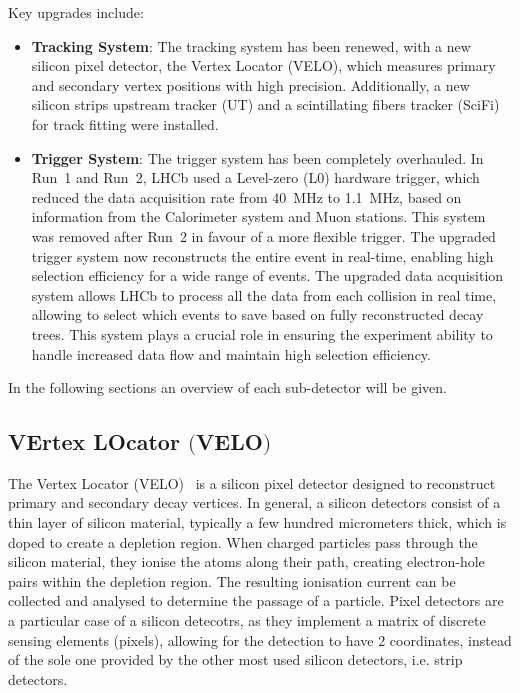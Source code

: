 Key upgrades include:
\begin{itemize}
\item \textbf{Tracking System}: The tracking system has been renewed, with a new silicon pixel detector, the Vertex Locator (VELO), which measures primary and secondary vertex positions with high precision. Additionally, a new silicon strips upstream tracker (UT) and a scintillating fibers tracker (SciFi) for track fitting were installed.

\item \textbf{Trigger System}: The trigger system has been completely overhauled. In Run~1 and Run~2, LHCb used a Level-zero (L$0$) hardware trigger, which reduced the data acquisition rate from \SI{40}{\mega\hertz} to \SI{1.1}{\mega\hertz}, based on information from the Calorimeter system and Muon stations. This system was removed after Run~2 in favour of a more flexible trigger. The upgraded trigger system now reconstructs the entire event in real-time, enabling high selection efficiency for a wide range of events. The upgraded data acquisition system allows LHCb to process all the data from each collision in real time, allowing to select which events to save based on fully reconstructed decay trees. This system plays a crucial role in ensuring the experiment ability to handle increased data flow and maintain high selection efficiency.
\end{itemize}
In the following sections an overview of each sub-detector will be given.

\subsection[VErtex LOcator]{VErtex LOcator $\bigl($VELO$\bigr)$}\label{sec:velo}
The Vertex Locator (VELO)~\cite{Bediaga:2013tje} is a silicon pixel detector designed to reconstruct primary and secondary decay vertices. In general, a silicon detectors consist of a thin layer of silicon material, typically a few hundred micrometers thick, which is doped to create a depletion region. When charged particles pass through the silicon material, they ionise the atoms along their path, creating electron-hole pairs within the depletion region. The resulting ionisation current can be collected and analysed to determine the passage of a particle. Pixel detectors are a particular case of a  silicon detecotrs, as they implement a matrix of discrete sensing elements (pixels), allowing for the detection to have 2 coordinates, instead of the sole one provided by the other most used silicon detectors, i.e. strip detectors. 

